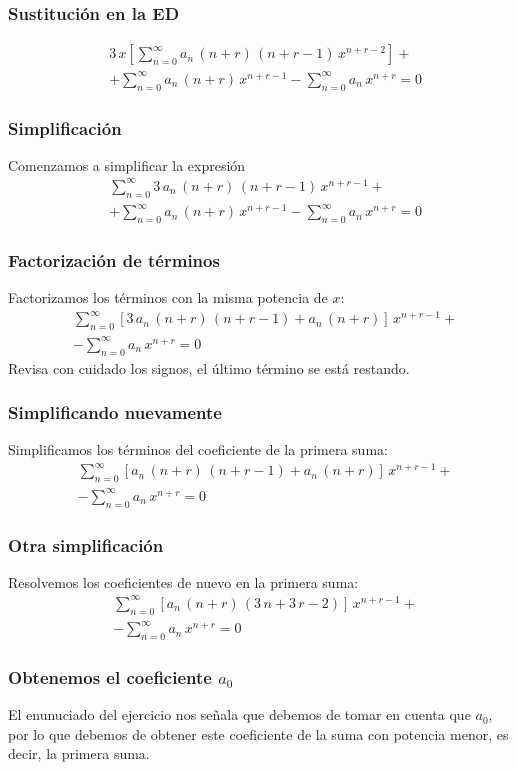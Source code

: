 \begin{frame}
\frametitle{Sustitución en la ED}
\begin{align*}
&3 \, x \left[ \sum_{n=0}^{\infty} a_{n} \, (n + r) \, (n+ r - 1) \, x^{n+r-2} \right] + \\[0.5em]
&+ \sum_{n=0}^{\infty} a_{n} \, (n + r) \, x^{n+r-1} - \sum_{n=0}^{\infty} a_{n} \, x^{n+r} = 0
\end{align*}
\end{frame}
\begin{frame}
\frametitle{Simplificación}
Comenzamos a simplificar la expresión
\begin{align*}
&\sum_{n=0}^{\infty} 3 \, a_{n} \, (n + r) \, (n+ r - 1) \, x^{n+r-1} + \\[0.5em]
&+ \sum_{n=0}^{\infty} a_{n} \, (n + r) \, x^{n+r-1} - \sum_{n=0}^{\infty} a_{n} \, x^{n+r} = 0
\end{align*}
\end{frame}
\begin{frame}
\frametitle{Factorización de términos}
Factorizamos los términos con la misma potencia de $x$:
\begin{align*}
&\sum_{n=0}^{\infty} \left[  3 \, a_{n} \, (n + r) \, (n+ r - 1) + a_{n} \, (n + r) \right] \, x^{n+r-1} + \\[0.5em]
&- \sum_{n=0}^{\infty} a_{n} \, x^{n+r} = 0
\end{align*}
\fontsize{12}{12}\selectfont
Revisa con cuidado los signos, el último término se está restando.
\end{frame}
\begin{frame}
\frametitle{Simplificando nuevamente}
Simplificamos los términos del coeficiente de la primera suma:
\begin{align*}
&\sum_{n=0}^{\infty} \left[  a_{n} \, (n + r) \, (n+ r - 1) + a_{n} \, (n + r) \right] \, x^{n+r-1} + \\[0.5em]
&- \sum_{n=0}^{\infty} a_{n} \, x^{n+r} = 0
\end{align*}   
\end{frame}
\begin{frame}
\frametitle{Otra simplificación}
Resolvemos los coeficientes de nuevo en la primera suma:
\begin{align*}
&\sum_{n=0}^{\infty} \left[  a_{n} \, (n + r) \, (3 \, n + 3 \, r - 2) \right] \, x^{n+r-1} + \\[0.5em]
&- \sum_{n=0}^{\infty} a_{n} \, x^{n+r} = 0
\end{align*}
\end{frame}
\begin{frame}
\frametitle{Obtenemos el coeficiente $a_{0}$}
El enunuciado del ejercicio nos señala que debemos de tomar en cuenta que $a_{0}$, por lo que debemos de obtener este coeficiente de la suma con potencia menor, es decir, la primera suma.
\end{frame}
